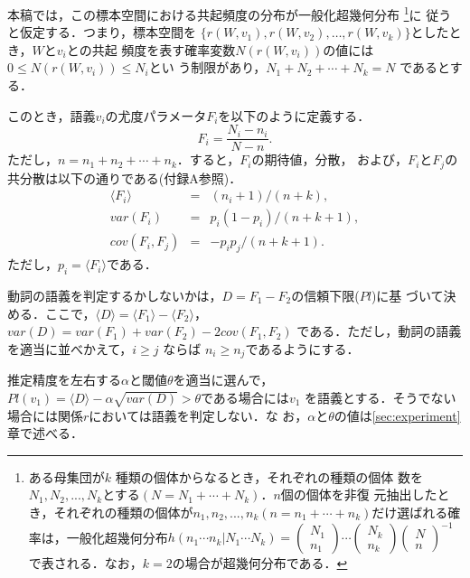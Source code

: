 本稿では，この標本空間における共起頻度の分布が一般化超幾何分布
\footnote{ある母集団が$k$ 種類の個体からなるとき，それぞれの種類の個体
数を$N_1,N_2,...,N_k$とする$(N=N_1 + \cdots + N_k)$．$n$個の個体を非復
元抽出したとき，それぞれの種類の個体が$n_1,n_2,...,n_k(n=n_1 + \cdots +
n_k)$だけ選ばれる確率は，一般化超幾何分布$ h(n_1 \cdots n_k|N_1 \cdots
N_k) = \left(
      \begin{array}{l}
        N_1 \\
        n_1
      \end{array}
    \right)
    \cdots
    \left(
      \begin{array}{l}
        N_k \\
        n_k
      \end{array}
    \right)
    \left(
      \begin{array}{l}
        N \\
        n
      \end{array}
    \right)^{-1} $で表される．なお，$k=2$の場合が超幾何分布である．}に
従うと仮定する．つまり，標本空間を
$\{r(W,v_1),r(W,v_2),\ldots,r(W,v_k)\}$としたとき，$W$と$v_i$との共起
頻度を表す確率変数$N(r(W,v_i))$の値には$0 \le N(r(W,v_i)) \le N_i$とい
う制限があり，$N_1 + N_2 + \cdots + N_k = N$ であるとする．

このとき，語義$v_i$の尤度パラメータ$F_i$を以下のように定義する．
\begin{equation}
  \label{D1}
  F_i = \frac{N_i - n_i}{N - n}.
\end{equation}
ただし，$n = n_1 + n_2 + \cdots + n_k$．すると，$F_i$の期待値，分散，
および，$F_i$と$F_j$の共分散は以下の通りである(付録A参照)．
\begin{eqnarray}
  \label{D2}
  \langle F_i \rangle & = &(n_i + 1)/(n + k), \\
  \label{D3}
  var(F_i) & = & p_i(1-p_i)/(n + k + 1), \\
  \label{D4}
  cov(F_i,F_j) & = & -p_i p_j /(n + k + 1).
\end{eqnarray}
ただし，$p_i = \langle F_i \rangle$である．

動詞の語義を判定するかしないかは，$D = F_1 - F_2$の信頼下限($Pl$)に基
づいて決める．ここで，$\langle D \rangle = \langle F_1 \rangle -
\langle F_2 \rangle$，$var(D) = var(F_1) + var(F_2) - 2 cov(F_1,F_2)$
である．ただし，動詞の語義を適当に並べかえて，$i \ge j$ ならば $n_i
\ge n_j$であるようにする．

推定精度を左右する$\alpha$と閾値$\theta$を適当に選んで，$Pl(v_1) =
\langle D \rangle - \alpha \sqrt{var(D)} > \theta$である場合には$v_1$
を語義とする．そうでない場合には関係$r$においては語義を判定しない．な
お，$\alpha$と$\theta$の値は\ref{sec:experiment} 章で述べる．

